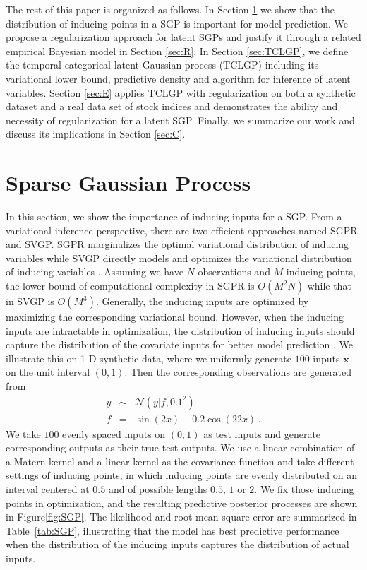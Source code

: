 \documentclass{article}
\begin{document}
The rest of this paper is organized as follows. In Section \ref{sec:SGP} we show that the distribution of inducing points in a SGP is important for model prediction. We propose a regularization approach for latent SGPs and justify it through a related empirical Bayesian model in Section \ref{sec:R}. In Section \ref{sec:TCLGP}, we define the temporal categorical latent Gaussian process (TCLGP) including its variational lower bound, predictive density and algorithm for inference of latent variables. Section \ref{sec:E} applies TCLGP with regularization on both a synthetic dataset and a real data set of stock indices and demonstrates the ability and necessity of regularization for a latent SGP. Finally, we summarize our work and discuss its implications in Section \ref{sec:C}.


\section{Sparse Gaussian Process} \label{sec:SGP}
In this section, we show the importance of inducing inputs for a SGP. From a variational inference perspective, there are two efficient approaches named SGPR and SVGP. SGPR marginalizes the optimal variational distribution of inducing variables \citep{Titsias_2009} while SVGP directly models and optimizes the variational distribution of inducing variables \citep{Hensman_2013}. Assuming we have $N$ observations and $M$ inducing points, the lower bound of computational complexity in SGPR is $O(M^2N)$ while that in SVGP is $O(M^3)$. Generally, the inducing inputs are optimized by maximizing the corresponding variational bound. However, when the inducing inputs are intractable in optimization, the distribution of inducing inputs should capture the distribution of the covariate inputs for better model prediction \cite{Raj_2011}. We illustrate this on 1-D synthetic data, where we uniformly generate $100$ inputs $\bm x$ on the unit interval $(0,1)$. Then the corresponding observations are generated from 
\begin{eqnarray}
y & \sim & \mathcal{N}(y|f, 0.1^2) \nonumber \\
f & = & \sin(2x) + 0.2\cos(22x) \nonumber \,.
\end{eqnarray} 
We take $100$ evenly spaced inputs on $(0,1)$ as test inputs and generate corresponding outputs as their true test outputs. We use a linear combination of a Matern kernel and a linear kernel as the covariance function and take different settings of inducing points, in which inducing points are evenly distributed on an interval centered at $0.5$ and of possible lengths $0.5$, $1$ or $2$. We fix those inducing points in optimization, and the resulting predictive posterior processes are shown in Figure\ref{fig:SGP}. The likelihood and root mean square error are summarized in Table~\ref{tab:SGP}, illustrating that the model has best predictive performance when the distribution of the inducing inputs captures the distribution of actual inputs.
\end{document}
